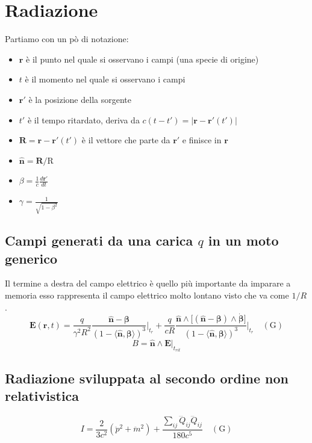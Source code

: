 \documentclass[11pt,a4paper]{report}
\newcommand{\vettore}[1]{\mathbf{#1}}
\newcommand{\vettorec}[1]{\textrm{#1}}
\newcommand{\pscal}[2]{\langle #1,#2\rangle}
\newcommand{\pvet}[2]{#1\wedge #2}
\begin{document}
	\section{Radiazione}
		Partiamo con un pò di notazione:
		\begin{itemize}
			\item $\vettore r$ è il punto nel quale si osservano i campi (una specie di origine)
			\item $t$ è il momento nel quale si osservano i campi
			\item $\vettore r'$ è la posizione della sorgente
			\item $t'$ è il tempo ritardato, deriva da $c(t-t')=|\vettore r-\vettore r'(t')|$
			\item $\vettore R=\vettore r-\vettore r'(t')$ è il vettore che parte da $\vettore r'$ e finisce in $\vettore r$
			\item $\hat{\vettore n}=\vettore R/\vettorec R$
			\item $\beta=\frac1c\frac{d\vettore r'}{dt}$
			\item $\gamma=\frac 1{\sqrt{1-\beta^2}}$
		\end{itemize}
		\subsection{Campi generati da una carica $q$ in un moto generico}
			Il termine a destra del campo elettrico è quello più importante da imparare a memoria esso rappresenta il campo elettrico molto lontano visto che va come $1/R$.
			\begin{equation}
				\vettore E(\vettore r,t)=\frac q{\gamma^2R^2}\frac{\hat{\vettore n}-\vettore \beta}{(1-\pscal{\hat{\vettore n}}{\vettore \beta})^3}\bigg|_{t_r}+
				\frac{q}{cR}
				\frac{\pvet{\hat{\vettore n}}{\big[\pvet{(\hat{\vettore n}-\vettore \beta)}{\dot{\vettore \beta}}\big]}}{(1-\pscal{\hat{\vettore n}}{\vettore \beta})^3}\bigg|_{t_r}\quad(\textrm {G})
				\label{eq:Eirr}
			\end{equation}
			\[
				B=\pvet{\hat{\vettore n}}{\vettore E}|_{t_{rit}}
			\]
		\subsection{Radiazione sviluppata al secondo ordine non relativistica}
			\begin{equation}
				I=\frac{2}{3c^2}(\ddot p^2+\ddot m^2)+\frac{\sum_{ij}\dddot Q_{ij}\dddot Q_{ij}}{180c^5}\quad(\textrm {G})
			\end{equation}
\end{document}
